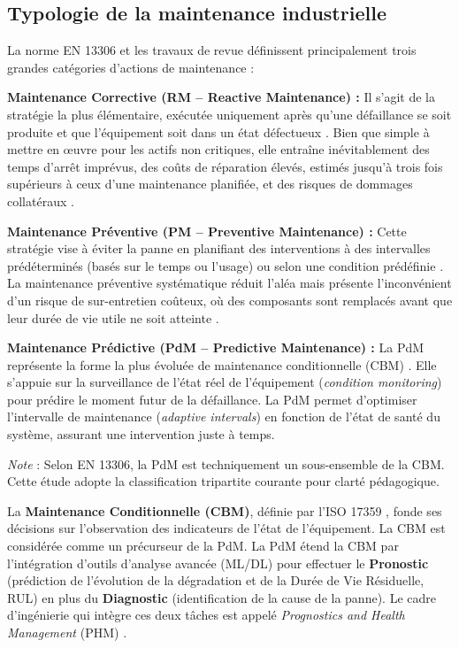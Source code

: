 \subsection{Typologie de la maintenance industrielle}

La norme EN 13306 \cite{en13306} et les travaux de revue \cite{ran2019} définissent principalement trois grandes catégories d'actions de maintenance :

\textbf{Maintenance Corrective (RM -- Reactive Maintenance) :} Il s'agit de la stratégie la plus élémentaire, exécutée uniquement après qu'une défaillance se soit produite et que l'équipement soit dans un état défectueux \cite{en13306,ran2019}. Bien que simple à mettre en œuvre pour les actifs non critiques, elle entraîne inévitablement des temps d'arrêt imprévus, des coûts de réparation élevés, estimés jusqu'à trois fois supérieurs à ceux d'une maintenance planifiée, et des risques de dommages collatéraux \cite{ran2019}.

\textbf{Maintenance Préventive (PM -- Preventive Maintenance) :} Cette stratégie vise à éviter la panne en planifiant des interventions à des intervalles prédéterminés (basés sur le temps ou l'usage) ou selon une condition prédéfinie \cite{en13306,ran2019}. La maintenance préventive systématique réduit l'aléa mais présente l'inconvénient d'un risque de sur-entretien coûteux, où des composants sont remplacés avant que leur durée de vie utile ne soit atteinte \cite{ran2019}.

\textbf{Maintenance Prédictive (PdM -- Predictive Maintenance) :} La PdM représente la forme la plus évoluée de maintenance conditionnelle (CBM) \cite{achouch2022,lee2014,jardine2006}. Elle s'appuie sur la surveillance de l'état réel de l'équipement (\textit{condition monitoring}) pour prédire le moment futur de la défaillance. La PdM permet d'optimiser l'intervalle de maintenance (\textit{adaptive intervals}) en fonction de l'état de santé du système, assurant une intervention juste à temps.

\textit{Note} : Selon EN 13306, la PdM est techniquement un sous-ensemble de la CBM. Cette étude adopte la classification tripartite courante pour clarté pédagogique.

La \textbf{Maintenance Conditionnelle (CBM)}, définie par l'ISO 17359 \cite{iso17359}, fonde ses décisions sur l'observation des indicateurs de l'état de l'équipement. La CBM est considérée comme un précurseur de la PdM. La PdM étend la CBM par l'intégration d'outils d'analyse avancée (ML/DL) pour effectuer le \textbf{Pronostic} (prédiction de l'évolution de la dégradation et de la Durée de Vie Résiduelle, RUL) en plus du \textbf{Diagnostic} (identification de la cause de la panne). Le cadre d'ingénierie qui intègre ces deux tâches est appelé \textit{Prognostics and Health Management} (PHM) \cite{lee2014,achouch2022}.

